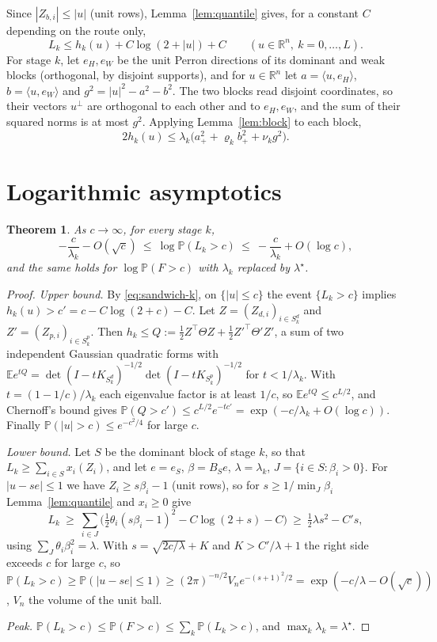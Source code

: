 \documentclass[11pt]{article}
\newtheorem{theorem}{Theorem}
\theoremstyle{definition}
\theoremstyle{remark}
\newcommand{\E}{\mathbb{E}}
\renewcommand{\P}{\mathbb{P}}
\newcommand{\R}{\mathbb{R}}
\newcommand{\ip}[2]{\langle #1,#2\rangle}
\begin{document}
Since $|Z_{b,i}|\le|u|$ (unit rows), Lemma~\ref{lem:quantile} gives, for a constant $C$
depending on the route only,
\begin{equation}\label{eq:sandwich-k}
L_k\le h_k(u)+C\log(2+|u|)+C\qquad(u\in\R^n,\ k=0,\dots,L).
\end{equation}
For stage $k$, let $e_H,e_W$ be the unit Perron directions of its dominant and weak
blocks (orthogonal, by disjoint supports), and for $u\in\R^n$ let $a=\ip u{e_H}$,
$b=\ip u{e_W}$ and $g^2=|u|^2-a^2-b^2$. The two blocks read disjoint coordinates, so
their vectors $u^\perp$ are orthogonal to each other and to $e_H,e_W$, and the sum of their
squared norms is at most $g^2$. Applying Lemma~\ref{lem:block} to each block,
\begin{equation}\label{eq:stage-form}
2h_k(u)\le\lambda_k\big(a_+^2+\varrho_k b_+^2+\nu_k g^2\big).
\end{equation}

\section{Logarithmic asymptotics}
\label{sec:ld}

\begin{theorem}\label{thm:ld}
As $c\to\infty$, for every stage $k$,
\[
-\frac{c}{\lambda_k}-O(\sqrt c)\ \le\ \log\P(L_k>c)\ \le\ -\frac{c}{\lambda_k}+O(\log c),
\]
and the same holds for $\log\P(F>c)$ with $\lambda_k$ replaced by $\lambda^\star$.
\end{theorem}

\begin{proof}
\emph{Upper bound.} By \eqref{eq:sandwich-k}, on $\{|u|\le c\}$ the event $\{L_k>c\}$
implies $h_k(u)>c'=c-C\log(2+c)-C$. Let $Z=(Z_{d,i})_{i\in S^d_k}$ and
$Z'=(Z_{p,i})_{i\in S^p_k}$. Then $h_k\le Q:=\frac12Z^\top\Theta Z+\frac12Z'^\top\Theta'Z'$,
a sum of two independent Gaussian quadratic forms with
$\E e^{tQ}=\det(I-tK_{S^d_k})^{-1/2}\det(I-tK_{S^p_k})^{-1/2}$ for $t<1/\lambda_k$. With
$t=(1-1/c)/\lambda_k$ each eigenvalue factor is at least $1/c$, so
$\E e^{tQ}\le c^{L/2}$, and Chernoff's bound gives
$\P(Q>c')\le c^{L/2}e^{-tc'}=\exp(-c/\lambda_k+O(\log c))$. Finally
$\P(|u|>c)\le e^{-c^2/4}$ for large $c$.

\emph{Lower bound.} Let $S$ be the dominant block of stage $k$, so that $L_k\ge
\sum_{i\in S}x_i(Z_i)$, and let $e=e_S$, $\beta=B_Se$, $\lambda=\lambda_k$,
$J=\{i\in S:\beta_i>0\}$. For $|u-se|\le1$ we have $Z_i\ge s\beta_i-1$ (unit rows), so for
$s\ge1/\min_J\beta_i$ Lemma~\ref{lem:quantile} and $x_i\ge0$ give
\[
L_k\ \ge\ \sum_{i\in J}\Big(\tfrac12\theta_i(s\beta_i-1)^2-C\log(2+s)-C\Big)
\ \ge\ \tfrac12\lambda s^2-C's,
\]
using $\sum_J\theta_i\beta_i^2=\lambda$. With $s=\sqrt{2c/\lambda}+K$ and $K>C'/\lambda+1$
the right side exceeds $c$ for large $c$, so
$\P(L_k>c)\ge\P(|u-se|\le1)\ge(2\pi)^{-n/2}V_ne^{-(s+1)^2/2}=\exp(-c/\lambda-O(\sqrt c))$,
$V_n$ the volume of the unit ball.

\emph{Peak.} $\P(L_k>c)\le\P(F>c)\le\sum_k\P(L_k>c)$, and $\max_k\lambda_k=\lambda^\star$.
\end{proof}
\end{document}
